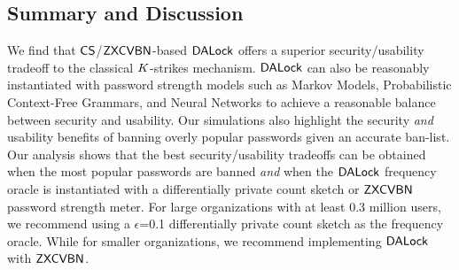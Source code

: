 \vspace*{-\baselineskip}
\subsection{Summary and Discussion}\label{sec:experiment_summary}

We find that $\mathsf{CS}$/$\mathsf{ZXCVBN}$-based $\mathsf{DALock}$ offers a superior security/usability tradeoff to the classical $K$-strikes mechanism. $\mathsf{DALock}$ can also be reasonably instantiated with password strength models such as Markov Models, Probabilistic Context-Free Grammars, and Neural Networks to achieve a reasonable balance between security and usability. Our simulations also highlight the security {\em and} usability benefits of banning overly popular passwords given an accurate ban-list. Our analysis shows that the best security/usability tradeoffs can be obtained when the most popular passwords are banned \textit{and} when the $\mathsf{DALock}$ frequency oracle is instantiated with a differentially private count sketch or $\mathsf{ZXCVBN}$ password strength meter. For large organizations with at least $0.3$ million users, we recommend using a $\epsilon$=0.1 differentially private count sketch as the frequency oracle. While for smaller organizations, we recommend implementing $\mathsf{DALock}$ with $\mathsf{ZXCVBN}$. 




